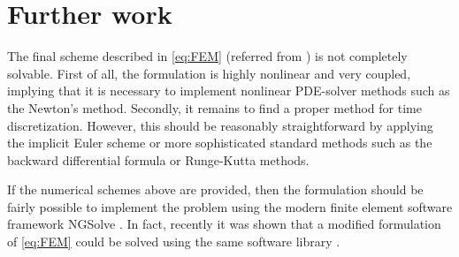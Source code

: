 \section{Further work}
The final scheme described in \eqref{eq:FEM} (referred from \cite{kovacs2021convergent}) is not completely solvable. First of all, the formulation is highly nonlinear and very coupled, implying that it is necessary to implement nonlinear PDE-solver methods such as the Newton's method. Secondly, it remains to find a proper method for time discretization. However, this should be reasonably straightforward by applying the implicit Euler scheme or more sophisticated standard methods such as the backward differential formula or Runge-Kutta methods.

If the numerical schemes above are provided, then the formulation should be fairly possible to implement the problem using the modern finite element software framework NGSolve \cite{schoberl2017netgen}. In fact, recently it was shown that a modified formulation of \eqref{eq:FEM} could be solved using the same software library \cite{hu2022evolving}.
